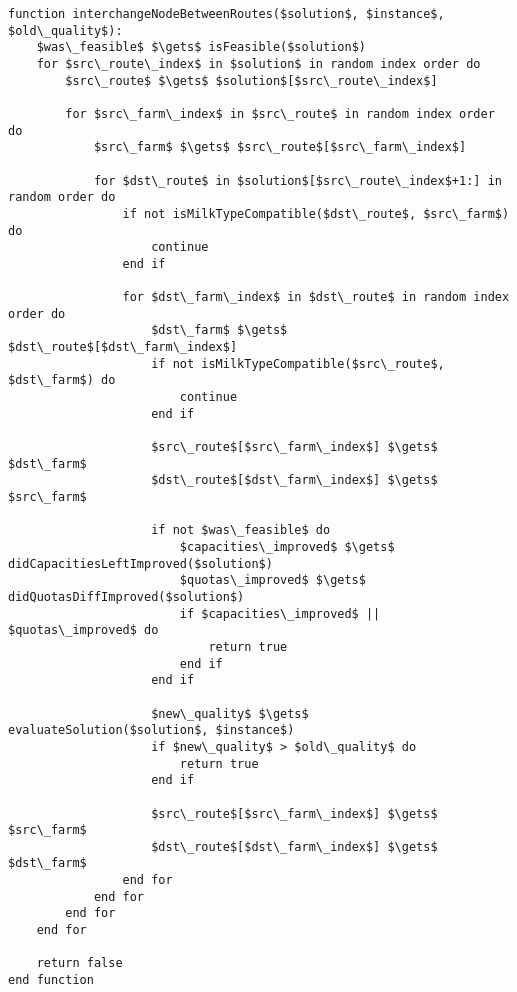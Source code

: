 \begin{lstlisting}[style=estiloPseudocodigo]
function interchangeNodeBetweenRoutes($solution$, $instance$, $old\_quality$):
    $was\_feasible$ $\gets$ isFeasible($solution$)
    for $src\_route\_index$ in $solution$ in random index order do
        $src\_route$ $\gets$ $solution$[$src\_route\_index$]

        for $src\_farm\_index$ in $src\_route$ in random index order do
            $src\_farm$ $\gets$ $src\_route$[$src\_farm\_index$]

            for $dst\_route$ in $solution$[$src\_route\_index$+1:] in random order do
                if not isMilkTypeCompatible($dst\_route$, $src\_farm$) do
                    continue
                end if

                for $dst\_farm\_index$ in $dst\_route$ in random index order do
                    $dst\_farm$ $\gets$ $dst\_route$[$dst\_farm\_index$]
                    if not isMilkTypeCompatible($src\_route$, $dst\_farm$) do
                        continue
                    end if

                    $src\_route$[$src\_farm\_index$] $\gets$ $dst\_farm$
                    $dst\_route$[$dst\_farm\_index$] $\gets$ $src\_farm$
                    
                    if not $was\_feasible$ do
                        $capacities\_improved$ $\gets$ didCapacitiesLeftImproved($solution$)
                        $quotas\_improved$ $\gets$ didQuotasDiffImproved($solution$)
                        if $capacities\_improved$ || $quotas\_improved$ do
                            return true
                        end if
                    end if

                    $new\_quality$ $\gets$ evaluateSolution($solution$, $instance$)
                    if $new\_quality$ > $old\_quality$ do
                        return true
                    end if

                    $src\_route$[$src\_farm\_index$] $\gets$ $src\_farm$
                    $dst\_route$[$dst\_farm\_index$] $\gets$ $dst\_farm$
                end for
            end for
        end for
    end for

    return false
end function
\end{lstlisting}
